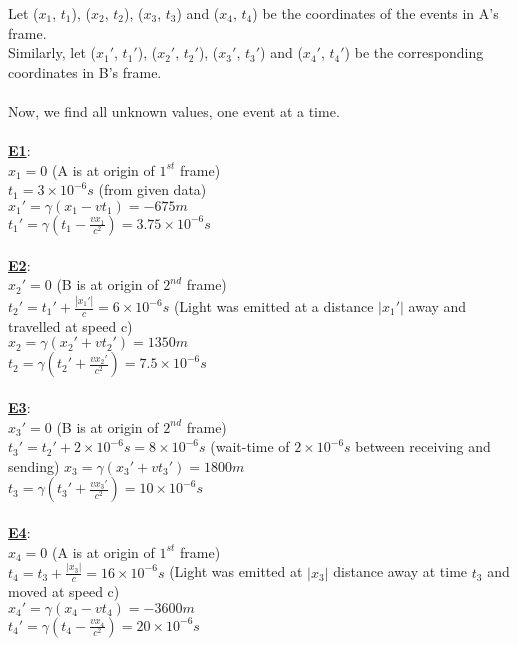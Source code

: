 \documentclass[10pt, a4paper]{article}
\begin{document}
\begin{enumerate}
Let ($x_{1}$, $t_{1}$), ($x_{2}$, $t_{2}$), ($x_{3}$, $t_{3}$) and ($x_{4}$, $t_{4}$) be the coordinates of the events in A's frame.\\
Similarly, let ($x_{1}'$, $t_{1}'$), ($x_{2}'$, $t_{2}'$), ($x_{3}'$, $t_{3}'$) and ($x_{4}'$, $t_{4}'$) be the corresponding coordinates in B's frame.\\
\\
Now, we find all unknown values, one event at a time. \\
\\
{\underline {\bf E1}}:\\
$x_{1} = 0$ \hfill(A is at origin of $1^{st}$ frame)\\
$t_{1} = 3\times10^{-6}s$ \hfill(from given data)\\
$x_{1}' = \gamma (x_{1}-vt_{1}) = -675m$ \\
$t_{1}' = \gamma (t_{1} - \frac{vx_{1}}{c^{2}}) = 3.75\times10^{-6}s$ \\
\\
{\underline {\bf E2}}:\\
$x_{2}' = 0$ \hfill(B is at origin of $2^{nd}$ frame)\\
$t_{2}' = t_{1}' + \frac{|{x_{1}'}|}{c} = 6\times10^{-6}s$ \hfill (Light was emitted at a distance $|{x_{1}'|}$ away and travelled at speed c)\\
$x_{2} = \gamma (x_{2}' + vt_{2}') = 1350m$ \\
$t_{2} = \gamma (t_{2}' + \frac{vx_{2}'}{c^{2}}) = 7.5\times10^{-6}s$ \\
\\
{\underline {\bf E3}}:\\
$x_{3}' = 0$ \hfill(B is at origin of $2^{nd}$ frame)\\
$t_{3}' = t_{2}' + 2\times10^{-6}s = 8\times10^{-6}s$ \hfill(wait-time of $2\times10^{-6}s$ between receiving and sending)
$x_{3} = \gamma (x_{3}' + vt_{3}') = 1800m$ \\
$t_{3} = \gamma (t_{3}' + \frac{vx_{3}'}{c^{2}}) = 10\times10^{-6}s$ \\
\\
{\underline {\bf E4}}:\\
$x_{4} = 0$ \hfill(A is at origin of $1^{st}$ frame)\\
$t_{4} = t_{3} + \frac{|{x_{3}}|}{c} = 16\times10^{-6}s$ \hfill (Light was emitted at $|{x_{3}|}$ distance away at time $t_{3}$ and moved at speed c)\\
$x_{4}' = \gamma (x_{4}-vt_{4}) = -3600m$ \\
$t_{4}' = \gamma (t_{4} - \frac{vx_{4}}{c^{2}}) = 20\times10^{-6}s$ \\

\end{enumerate}
\end{document}
